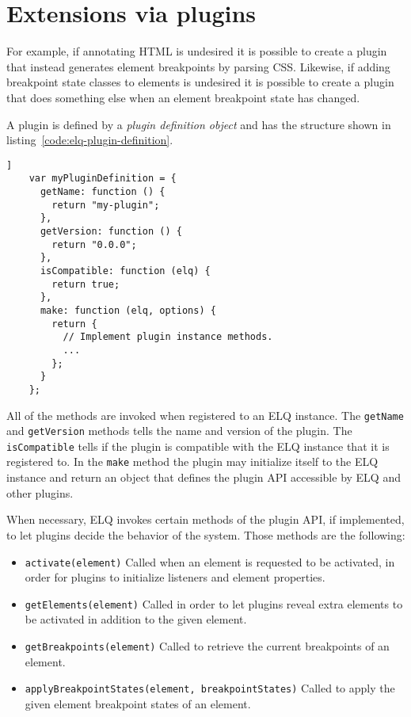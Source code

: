 \documentclass{acm_proc_article-sp}
\newcommand{\code}[1]{\texttt{#1}}
\newcommand{\elq}{ELQ}
\begin{document}
\section{Extensions via plugins}\label{sec:plugins}
  For example, if annotating HTML is undesired it is possible to create a plugin that instead generates element breakpoints by parsing CSS.
  Likewise, if adding breakpoint state classes to elements is undesired it is possible to create a plugin that does something else when an element breakpoint state has changed.

  A plugin is defined by a \emph{plugin definition object} and has the structure shown in listing~\ref{code:elq-plugin-definition}.
  \begin{lstlisting}[gobble=4,caption={The structure of plugin definition objects.},captionpos=b,label={code:elq-plugin-definition}]]
    var myPluginDefinition = {
      getName: function () {
        return "my-plugin";
      },
      getVersion: function () {
        return "0.0.0";
      },
      isCompatible: function (elq) {
        return true;
      },
      make: function (elq, options) {
        return {
          // Implement plugin instance methods.
          ...
        };
      }
    };
  \end{lstlisting}

  All of the methods are invoked when registered to an \elq{} instance.
  The \code{getName} and \code{getVersion} methods tells the name and version of the plugin.
  The \code{isCompatible} tells if the plugin is compatible with the \elq{} instance that it is registered to.
  In the \code{make} method the plugin may initialize itself to the \elq{} instance and return an object that defines the plugin API accessible by \elq{} and other plugins.

  When necessary, \elq{} invokes certain methods of the plugin API, if implemented, to let plugins decide the behavior of the system.
  Those methods are the following:
  \begin{itemize}
    \item \code{activate(element)}
          Called when an element is requested to be activated, in order for plugins to initialize listeners and element properties.
    \item \code{getElements(element)}
          Called in order to let plugins reveal extra elements to be activated in addition to the given element.
    \item \code{getBreakpoints(element)}
          Called to retrieve the current breakpoints of an element.
    \item \code{applyBreakpointStates(element, breakpointStates)}
          Called to apply the given element breakpoint states of an element.
  \end{itemize}
\end{document}
